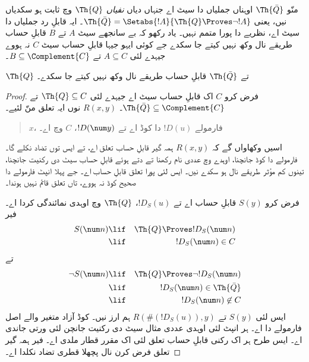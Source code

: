 \documentclass[../../../include/open-logic-section]{subfiles}
\begin{document}


منّو $\Th{\bar Q}$ اوہناں جملیاں دا سیٹ اے جنہاں دیاں
{\em نفیاں} $\Th{Q}$ وچ ثابت ہو سکدیاں نیں، یعنی
$\Th{\bar Q} = \Setabs{!A}{\Th{Q} \Proves
  \lnot !A}$۔ ایہ قابلِ رد جملیاں دا سیٹ اے، نظریے دا پورا
متمم نہیں۔ یاد رکھو کہ بے سانجھے سیٹ $A$ تے $B$ قابلِ حساب
طریقے نال وکھ نہیں کیتے جا سکدے جے کوئی ایہو جیہا قابلِ حساب
سیٹ $C$ نہ ہووے جیہدے لئی $A
\subseteq C$ تے $B \subseteq \Complement{C}$۔

\begin{lem}
$\Th{Q}$ تے $\Th{\bar Q}$ قابلِ حساب طریقے نال وکھ نہیں کیتے
جا سکدے۔
\end{lem}

\begin{proof}
فرض کرو $C$ اک قابلِ حساب سیٹ اے جیہدے لئی $\Th{Q} \subseteq C$
تے $\Th{\bar Q} \subseteq \Complement{C}$۔ $R(x,y)$ نوں ایہ
تعلق منّ لئیے۔
\begin{quote}
$x$، فارمولے $!D(u)$ دا کوڈ اے تے $!D(\num y)$، $C$ وچ اے۔
\end{quote}
اسیں وکھاواں گے کہ $R(x,y)$ ہمہ گیر قابلِ حساب تعلق اے،
تے ایس توں تضاد نکلے گا۔ فارمولے دا کوڈ جانچنا، اوہدے وچ عددی
نام رکھنا تے دتے ہوئے قابلِ حساب سیٹ دی رکنیت جانچنا، تینوں کم
مؤثر طریقے نال ہو سکدے نیں۔ ایس لئی پورا تعلق قابلِ حساب اے۔
جے پہلا انپٹ فارمولے دا صحیح کوڈ نہ ہووے، تاں تعلق قائم نہیں ہوندا۔

فرض کرو $S(y)$ قابلِ حساب اے تے $!D_S(u)$، $\Th{Q}$ وچ
اوہدی نمائندگی کردا اے۔ فیر
\begin{eqnarray*}
S(\num n) & \lif & \Th{Q} \Proves !D_S(\num n) \\
& \lif & !D_S(\num n) \in C
\end{eqnarray*}
تے
\begin{eqnarray*}
\lnot S(\num n) & \lif & \Th{Q} \Proves \lnot !D_S(\num n) \\
& \lif & !D_S(\num n) \in \Th{\bar Q} \\
& \lif & !D_S(\num n) \not\in C
\end{eqnarray*}
ایس لئی $S(y)$ تے $R(\#(!D_S(u)),y)$ ہم ارز نیں۔ کوڈ آزاد
متغیر والے اصل فارمولے دا اے۔ ہر انپٹ لئی اوہدی عددی مثال
سیٹ دی رکنیت جانچن لئی ورتی جاندی اے۔ ایس طرح ہر اک رکنی
قابلِ حساب تعلق لئی اک مقرر قطار ملدی اے۔ فیر ہمہ گیر تعلق
فرض کرن نال پچھلا قطری تضاد نکلدا اے۔
\end{proof}
\end{document}
